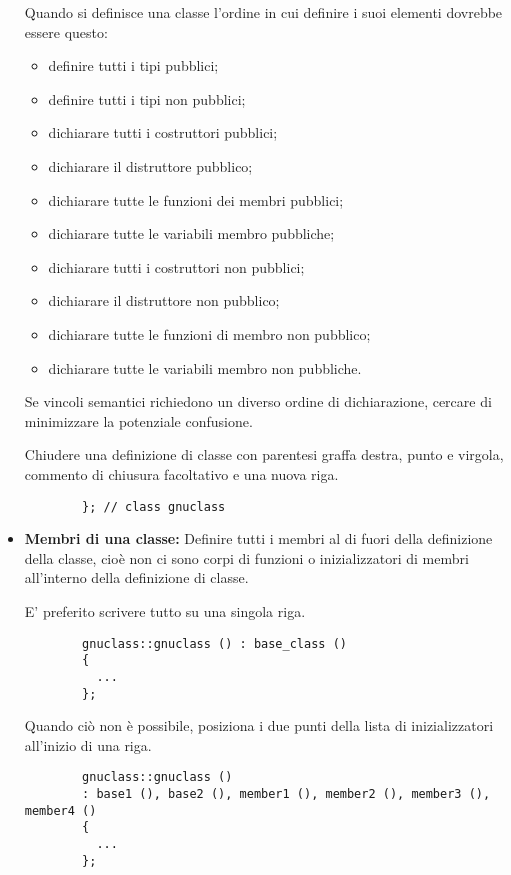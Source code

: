 \documentclass[../NomeDocumento.tex]{subfiles}
\begin{document}
\begin{itemize}
		Quando si definisce una classe l'ordine in cui definire i suoi elementi dovrebbe essere questo:
					
		\begin{itemize}
			\item definire tutti i tipi pubblici;
			\item definire tutti i tipi non pubblici;
			\item dichiarare tutti i costruttori pubblici;
			\item dichiarare il distruttore pubblico;
			\item dichiarare tutte le funzioni dei membri pubblici;
			\item dichiarare tutte le variabili membro pubbliche;
			\item dichiarare tutti i costruttori non pubblici;
			\item dichiarare il distruttore non pubblico;
			\item dichiarare tutte le funzioni di membro non pubblico;
			\item dichiarare tutte le variabili membro non pubbliche.				
		\end{itemize}
			
		Se vincoli semantici richiedono un diverso ordine di dichiarazione, cercare di minimizzare la potenziale confusione.
			
		Chiudere una definizione di classe con parentesi graffa destra, punto e virgola, commento di chiusura facoltativo e una nuova riga.
			
		\begin{verbatim}
		}; // class gnuclass
		\end{verbatim}
		
		\item \textbf{Membri di una classe:} Definire tutti i membri al di fuori della definizione della classe, cioè non ci sono corpi di funzioni o inizializzatori di membri all'interno della definizione di classe.
		
		E' preferito scrivere tutto su una singola riga.
		
		\begin{verbatim}
		gnuclass::gnuclass () : base_class ()
		{ 
		  ...
		};
		\end{verbatim}
		
		Quando ciò non è possibile, posiziona i due punti della lista di inizializzatori all'inizio di una riga.
		
		\begin{verbatim}
		gnuclass::gnuclass ()
		: base1 (), base2 (), member1 (), member2 (), member3 (), member4 ()
		{ 
		  ...
		};
		\end{verbatim}
		

\end{itemize}
\end{document}
